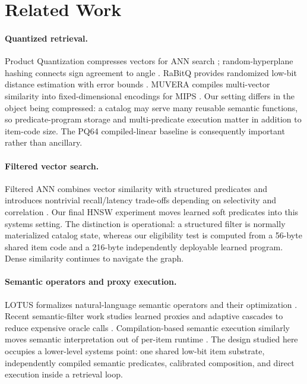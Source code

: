 
\section{Related Work}
\paragraph{Quantized retrieval.} Product Quantization compresses vectors for ANN search \citep{jegou2011pq}; random-hyperplane hashing connects sign agreement to angle \citep{charikar2002simhash}. RaBitQ provides randomized low-bit distance estimation with error bounds \citep{gao2024rabitq}. MUVERA compiles multi-vector similarity into fixed-dimensional encodings for MIPS \citep{dhulipala2024muvera}. Our setting differs in the object being compressed: a catalog may serve many reusable semantic functions, so predicate-program storage and multi-predicate execution matter in addition to item-code size. The PQ64 compiled-linear baseline is consequently important rather than ancillary.

\paragraph{Filtered vector search.} Filtered ANN combines vector similarity with structured predicates and introduces nontrivial recall/latency trade-offs depending on selectivity and correlation \citep{chronis2025filtered}. Our final HNSW experiment moves learned soft predicates into this systems setting. The distinction is operational: a structured filter is normally materialized catalog state, whereas our eligibility test is computed from a 56-byte shared item code and a 216-byte independently deployable learned program. Dense similarity continues to navigate the graph.

\paragraph{Semantic operators and proxy execution.} LOTUS formalizes natural-language semantic operators and their optimization \citep{patel2025lotus}. Recent semantic-filter work studies learned proxies and adaptive cascades to reduce expensive oracle calls \citep{kim2026semanticfilter}. Compilation-based semantic execution similarly moves semantic interpretation out of per-item runtime \citep{dong2026compilation}. The design studied here occupies a lower-level systems point: one shared low-bit item substrate, independently compiled semantic predicates, calibrated composition, and direct execution inside a retrieval loop.

